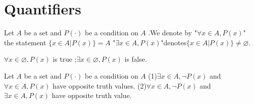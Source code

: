 \documentclass{book}
\numberwithin{equation}{section}
\begin{document}
\section{Quantifiers}
\begin{definitionenv}
    Let $A$ be a set and $P(\cdot)$ be a condition on $A$ .We denote by 
    \newline
    "$\forall x\in A, P(x)$" the statement $\{x\in A|P(x)\}=A$
    \newline
    "$\exists x\in A,P(x)$"denotes$\{x\in A|P(x)\}\not= \varnothing$.
\end{definitionenv}
\begin{exampleenv}
    $\forall x\in \varnothing ,P(x)$ is true ;$\exists x\in \varnothing,P(x)$ is false.
\end{exampleenv}
\begin{theoremenv}\label{theorem2.4.1}
    Let $A$ be a set and $P(\cdot)$ be a condition on $A$
    \newline
    (1)$\exists x\in A,\neg P(x) $ and $ \forall x\in A,P(x)$ have opposite truth values.
    \newline
    (2)$\forall x\in A,\neg P(x)$ and $\exists x\in A,P(x)$ have opposite truth value.
\end{theoremenv}
\end{document}

